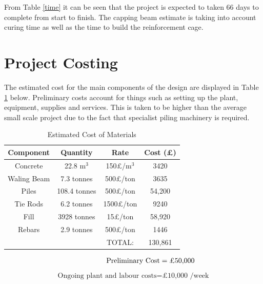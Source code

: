 \documentclass[12pt, a4paper]{article}
\begin{document}
\begin{justify}
From Table \ref{time} it can be seen that the project is expected to taken 66 days to complete from start to finish. The capping beam estimate is taking into account curing time as well as the time to build the reinforcement cage. 
\end{justify}
\section{Project Costing}
\begin{justify}
The estimated cost for the main components of the design are displayed in Table \ref{cost} below. Preliminary costs account for things such as setting up the plant, equipment, supplies and services. This is taken to be higher than the average small scale project due to the fact that specialist piling machinery is required. 
\end{justify}
\begin{table}[H]
    \centering
    \begin{tabular}{|c|c|c|c|}
    \hline
      \textbf{Component}&\textbf{Quantity}&\textbf{Rate}&\textbf{Cost (£)} \\ \hline
      Concrete&22.8 m$^3$&150\hspace*{0.1cm}£/m$^3$&3420 \\ \hline
      Waling Beam&7.3 tonnes&500\hspace*{0.1cm}£/ton&3635 \\ \hline
      Piles&108.4 tonnes&500\hspace*{0.1cm}£/ton&54,200 \\ \hline
      Tie Rods&6.2 tonnes&1500\hspace*{0.1cm}£/ton&9240 \\ \hline
      Fill&3928 tonnes&15\hspace*{0.1cm}£/ton&58,920 \\ \hline
      Rebars&2.9 tonnes&500\hspace*{0.1cm}£/ton&1446 \\ \hline
      & & TOTAL:&130,861\\ \hline
    \end{tabular}
    \caption{Estimated Cost of Materials}
    \label{cost}
\end{table}
\begin{align*}
\hspace*{1.7cm}
   \text{Preliminary Cost}=\text{£50,000}
\end{align*}
\begin{align*}
    \text{Ongoing plant and labour costs}=\text{£10,000 /week}
\end{align*}
\end{document}
